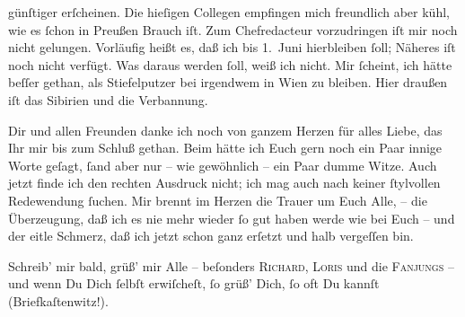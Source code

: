                günſtiger erſcheinen. Die hieſigen Collegen empfingen mich freundlich aber kühl, wie
               es ſchon in Preußen Brauch iſt. Zum Chefredacteur vorzudringen
               iſt mir noch nicht gelungen. Vorläufig heißt es, daß ich bis 1. Juni hierbleiben ſoll; Näheres iſt noch nicht verfügt. Was daraus
               werden ſoll, weiß ich nicht. Mir ſcheint, ich hätte beſſer gethan, als {\pb}Stiefelputzer bei irgendwem in Wien zu bleiben. Hier draußen iſt das Sibirien und die Verbannung.\pend
           
\pstart
           Dir und allen Freunden danke ich noch von ganzem Herzen für alles Liebe, das Ihr  mir bis zum Schluß gethan. Beim \label{K_L02660-2v}\label{K_L02660-2} hätte ich
               Euch gern noch ein Paar innige Worte geſagt, ſand aber nur – wie gewöhnlich – ein
               Paar dumme Witze. Auch jetzt finde ich den rechten Ausdruck nicht; ich mag auch nach
               keiner ſtylvollen Redewendung ſuchen. Mir brennt im Herzen die Trauer um Euch Alle, –
               die Überzeugung, daß ich es nie mehr wieder ſo gut haben werde wie bei Euch – und der
               eitle Schmerz, daß ich jetzt schon ganz erſetzt und halb vergeſſen bin.\pend
           
\pstart
           Schreib’ mir bald, grüß’ mir Alle – beſonders \textsc{Richard}, \textsc{Loris} und die \textsc{Fanjungs} – und wenn Du Dich {\pb}ſelbſt erwiſcheſt, ſo
               grüß’ Dich, ſo oft Du kannſt (Briefkaſtenwitz!).\pend
           

